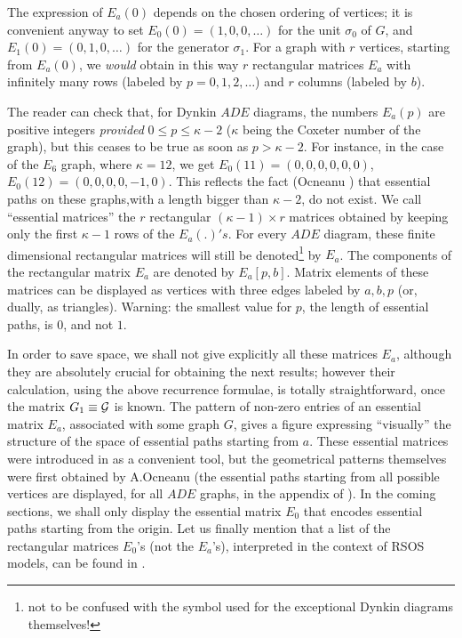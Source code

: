 \documentclass[a4paper,11pt]{article}
\begin{document}
The expression of $E_a(0)$ depends on the chosen ordering of vertices; it is
convenient
anyway to set $E_0(0)=(1,0,0,\ldots)$ for the unit $\sigma_{0}$ of $G$, and
$E_1(0)=(0,1,0,\ldots)$ for the generator
$\sigma_1$.
For a graph with $r$ vertices, starting from $E_a(0)$, we {\sl
would} obtain in this way $r$ rectangular
matrices $E_a$ with infinitely many rows (labeled by $p=0,1,2,\ldots$)
       and $r$ columns (labeled by $b$).


The reader can check that, for Dynkin $ADE$ diagrams,
the numbers $E_a(p)$ are positive integers {\sl
provided} $0 \leq p \leq \kappa-2$ ($\kappa$ being the Coxeter number
of the graph),
but this ceases to be true as soon as $p>\kappa-2$. For instance, in
the case of the $E_6$ graph,
where $\kappa = 12$, we get $E_0(11) = (0,0,0,0,0,0)$,  $E_0(12) =
(0,0,0,0,-1,0)$.
This reflects the fact (Ocneanu \cite{Ocneanu:paths}) that essential
paths on these graphs,with a length bigger
than $\kappa-2$, do not exist.
We call ``essential matrices''  the $r$ rectangular $(\kappa-1) \times
r$ matrices
obtained by keeping only the first $\kappa-1$ rows of the $E_a(.)'s.$
For every $ADE$ diagram, these finite dimensional rectangular
matrices will still be
denoted\footnote{
not to be confused with the symbol used for the exceptional Dynkin diagrams
themselves!} by $E_a$.
The components of the rectangular matrix $E_a$ are denoted by  $E_a[p,b]$.
Matrix elements of these matrices can be displayed as vertices
with three edges labeled by $a,b,p$ (or, dually, as triangles).
Warning: the smallest value for $p$, the length of essential paths,
is $0$, and not $1$.



In order to save space, we shall not give explicitly all these
matrices $E_a$, although
they are absolutely crucial for obtaining the next results;
however their calculation,
using the above recurrence formulae, is totally straightforward, once
the matrix
$G_1 \equiv {\cal G}$ is known.
The pattern of non-zero entries of an essential matrix $E_a$,
associated with some
graph $G$,
gives a figure expressing ``visually'' the structure of the space of
essential paths
starting
from $a$. These essential matrices were introduced in \cite{Coque:qtetra} as a
convenient
tool, but the geometrical patterns themselves were first obtained  by
A.Ocneanu (the essential paths starting from all possible vertices
are displayed, for all $ADE$ graphs, in the appendix of
\cite{Ocneanu:paths}).  In the coming sections, we shall only display the
essential matrix $E_{0}$ that encodes essential paths starting from the
origin. Let us finally mention that a list of
the rectangular matrices $E_{0}$'s (not the $E_{a}$'s), interpreted 
in the context of RSOS models, can be found in
\cite{PearceZhou:RSOS}.
\end{document}
